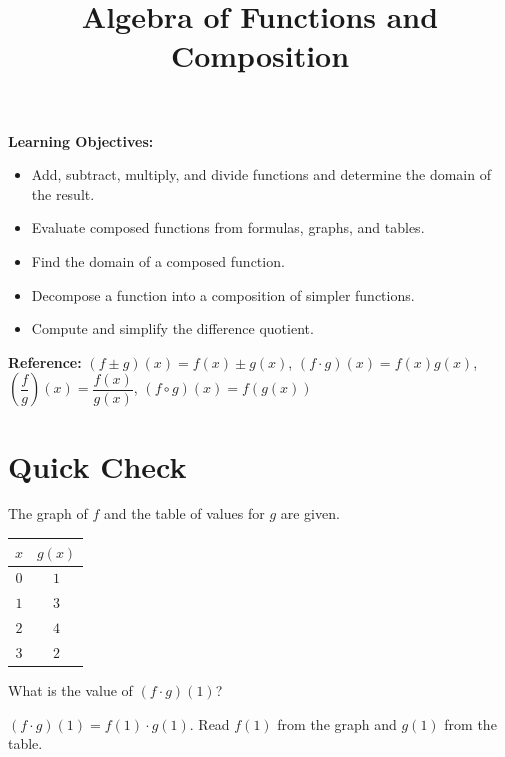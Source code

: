 \documentclass{ximera}
\title{Algebra of Functions and Composition}
\begin{document}
\begin{abstract}
\end{abstract}
\maketitle

\textbf{Learning Objectives:}
\begin{itemize}
  \item Add, subtract, multiply, and divide functions and determine the domain of the result.
  \item Evaluate composed functions from formulas, graphs, and tables.
  \item Find the domain of a composed function.
  \item Decompose a function into a composition of simpler functions.
  \item Compute and simplify the difference quotient.
\end{itemize}
\medskip

\noindent\textbf{Reference:} $(f\pm g)(x) = f(x)\pm g(x)$, \quad $(f\cdot g)(x) = f(x)g(x)$, \quad $\left(\dfrac{f}{g}\right)(x) = \dfrac{f(x)}{g(x)}$, \quad $(f\circ g)(x) = f(g(x))$

\bigskip
\section*{Quick Check}

\begin{problem}
The graph of $f$ and the table of values for $g$ are given.

\begin{center}
\quad
\begin{tabular}{|c|c|}
\hline
$x$ & $g(x)$ \\\hline
$0$ & $1$ \\
$1$ & $3$ \\
$2$ & $4$ \\
$3$ & $2$ \\\hline
\end{tabular}
\end{center}

What is the value of $(f \cdot g)(1)$?
\begin{hint}
$(f\cdot g)(1) = f(1)\cdot g(1)$. Read $f(1)$ from the graph and $g(1)$ from the table.
\end{hint}
\begin{multipleChoice}
\end{multipleChoice}
\end{problem}
\end{document}

